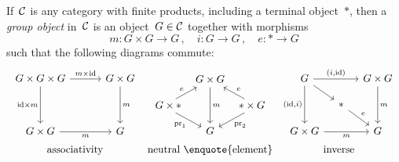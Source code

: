 \begin{remark}
  If~$\mathcal{C}$ is any category with finite products, including a terminal object~$\ast$, then a \emph{group object} in~$\mathcal{C}$ is an object~$G \in \mathcal{C}$ together with morphisms
  \[
    m \colon G \times G \to G \,,
    \quad
    i \colon G \to G \,,
    \quad
    e \colon \ast \to G
  \]
  such that the following diagrams commute:
  \[
    \renewcommand{\arraystretch}{1.5}
    \renewcommand{\arraycolsep}{4pt}
    \begin{array}{ccc}
        \begin{tikzcd}[row sep = 36pt, column sep = 30pt]
            G \times G \times G
            \arrow{r}[above]{m \times {\id}}
            \arrow{d}[left]{{\id} \times m}
          & G \times G
            \arrow{d}[right]{m}
          \\
            G \times G
            \arrow{r}[below]{m}
          & G
        \end{tikzcd}
      &
        \begin{tikzcd}[row sep = 10pt, column sep = 15pt]
            {}
          & G \times G
            \arrow{dd}[right]{m}
          & {}
          \\
            G \times * \hspace{-10pt}
            \arrow{ur}[above left]{e}
            \arrow{dr}[below left]{\operatorname{pr}_1}
          & {}
          & \hspace{-10pt} * \times G
            \arrow{ul}[above right]{e}
            \arrow{dl}[below right]{\operatorname{pr}_2}
          \\
            {}
          & G
          & {}
        \end{tikzcd}
      &
        \begin{tikzcd}[row sep = 12pt, column sep = 10pt]
            G
            \arrow{rr}[above]{(i,\id)}
            \arrow{dd}[left]{(\id,i)}
            \arrow{dr}
          & {}
          & G \times G
            \arrow{dd}[right]{m}
          \\
            {}
          & *
            \arrow{dr}{e}
          & {}
          \\
            G \times G
            \arrow{rr}[below]{m}
          & {}
          & G
        \end{tikzcd}
    \\
        \text{associativity}
      & \text{neutral \enquote{element}}
      & \text{inverse}
    \end{array}
  \]
\end{remark}



